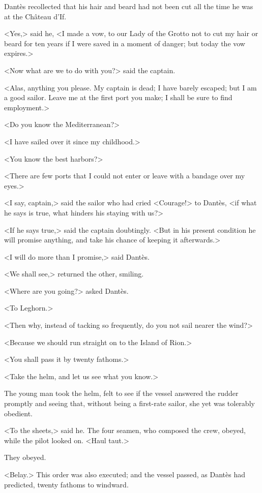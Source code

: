  Dantès recollected that his hair and beard had not been cut all the time he was at the Château d'If. 

 <Yes,> said he, <I made a vow, to our Lady of the Grotto not to cut my hair or beard for ten years if I were saved in a moment of danger; but today the vow expires.> 

 <Now what are we to do with you?> said the captain. 

 <Alas, anything you please. My captain is dead; I have barely escaped; but I am a good sailor. Leave me at the first port you make; I shall be sure to find employment.> 

 <Do you know the Mediterranean?> 

 <I have sailed over it since my childhood.> 

 <You know the best harbors?> 

 <There are few ports that I could not enter or leave with a bandage over my eyes.> 

 <I say, captain,> said the sailor who had cried <Courage!> to Dantès, <if what he says is true, what hinders his staying with us?> 

 <If he says true,> said the captain doubtingly. <But in his present condition he will promise anything, and take his chance of keeping it afterwards.> 

 <I will do more than I promise,> said Dantès. 

 <We shall see,> returned the other, smiling. 

 <Where are you going?> asked Dantès. 

 <To Leghorn.> 

 <Then why, instead of tacking so frequently, do you not sail nearer the wind?> 

 <Because we should run straight on to the Island of Rion.> 

 <You shall pass it by twenty fathoms.> 

 <Take the helm, and let us see what you know.> 

 The young man took the helm, felt to see if the vessel answered the rudder promptly and seeing that, without being a first-rate sailor, she yet was tolerably obedient. 

 <To the sheets,> said he. The four seamen, who composed the crew, obeyed, while the pilot looked on. <Haul taut.> 

 They obeyed. 

 <Belay.> This order was also executed; and the vessel passed, as Dantès had predicted, twenty fathoms to windward. 

